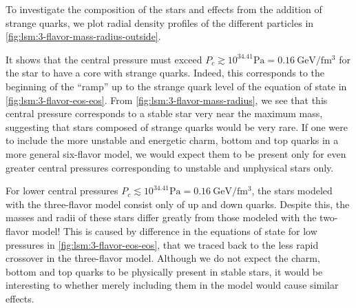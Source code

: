 To investigate the composition of the stars and effects from the addition of strange quarks,
we plot radial density profiles of the different particles in \cref{fig:lsm:3-flavor-mass-radius-outside}.

It shows that the central pressure must exceed $P_c \gtrsim 10^{34.41} \si{\pascal} = \SI{0.16}{\giga\electronvolt\per\femto\meter\cubed}$ for the star to have a core with strange quarks.
Indeed, this corresponds to the beginning of the ``ramp'' up to the strange quark level of the equation of state in \cref{fig:lsm:3-flavor-eos-eos}.
From \cref{fig:lsm:3-flavor-mass-radius}, we see that this central pressure corresponds to a stable star very near the maximum mass, suggesting that stars composed of strange quarks would be very rare.
If one were to include the more unstable and energetic charm, bottom and top quarks in a more general six-flavor model, we would expect them to be present only for even greater central pressures corresponding to unstable and unphysical stars only. 

For lower central pressures $P_c \lesssim 10^{34.41} \si{\pascal} = \SI{0.16}{\giga\electronvolt\per\femto\meter\cubed}$, the stars modeled with the three-flavor model consist only of up and down quarks.
Despite this, the masses and radii of these stars differ greatly from those modeled with the two-flavor model!
This is caused by difference in the equations of state for low pressures in \cref{fig:lsm:3-flavor-eos-eos}, that we traced back to the less rapid crossover in the three-flavor model.
Although we do not expect the charm, bottom and top quarks to be physically present in stable stars, it would be interesting to whether merely including them in the model would cause similar effects.

